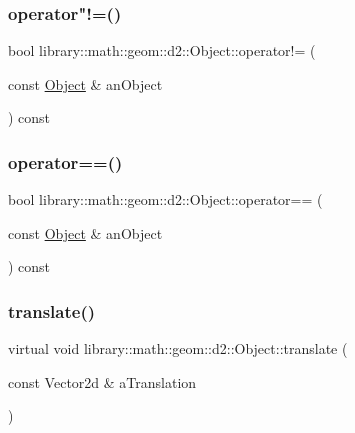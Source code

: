 \subsubsection{\texorpdfstring{operator"!=()}{operator!=()}}
{\footnotesize\ttfamily bool library\+::math\+::geom\+::d2\+::\+Object\+::operator!= (\begin{DoxyParamCaption}\item[{const \hyperlink{classlibrary_1_1math_1_1geom_1_1d2_1_1_object}{Object} \&}]{an\+Object }\end{DoxyParamCaption}) const}

\mbox{\label{classlibrary_1_1math_1_1geom_1_1d2_1_1_object_a97aeb08c0dbe7f803188ae335f6b0e7a}} 
\subsubsection{\texorpdfstring{operator==()}{operator==()}}
{\footnotesize\ttfamily bool library\+::math\+::geom\+::d2\+::\+Object\+::operator== (\begin{DoxyParamCaption}\item[{const \hyperlink{classlibrary_1_1math_1_1geom_1_1d2_1_1_object}{Object} \&}]{an\+Object }\end{DoxyParamCaption}) const}

\mbox{\label{classlibrary_1_1math_1_1geom_1_1d2_1_1_object_a00a8bec981c21c0298af86c495fe4341}} 
\subsubsection{\texorpdfstring{translate()}{translate()}}
{\footnotesize\ttfamily virtual void library\+::math\+::geom\+::d2\+::\+Object\+::translate (\begin{DoxyParamCaption}\item[{const Vector2d \&}]{a\+Translation }\end{DoxyParamCaption})\hspace{0.3cm}{\ttfamily [pure virtual]}}



